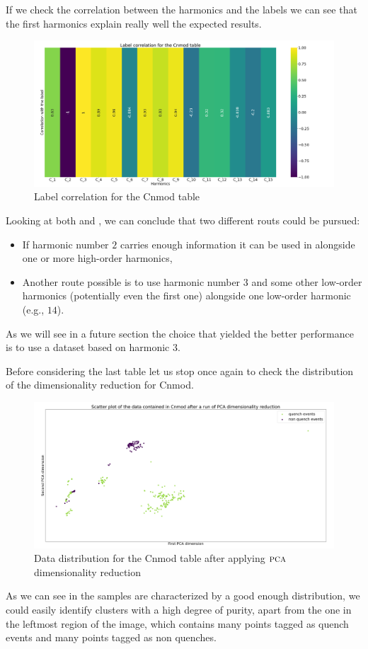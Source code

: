 If we check the correlation between the harmonics and the labels  we can see
that the first harmonics explain really well the expected results.
\begin{figure}[h!]
	\centering
	\includegraphics[width=\linewidth]{img/Cnmod_label_corr.png}
	\caption{Label correlation for the Cnmod table} \label{fig:cnmod-lcorr}
\end{figure}

Looking at both  and , we can conclude that two different
routs could be pursued:
\begin{itemize}
	\item If harmonic number $2$ carries enough information it can be used in alongside one or
	      more high-order harmonics,
	\item Another route possible is to use harmonic number $3$ and some other low-order
	      harmonics (potentially even the first one) alongside one low-order harmonic (e.g.,
	      $14$).
\end{itemize}
As we will see in a future section the choice that yielded the better performance is to use a
dataset based on harmonic $3$.

Before considering the last table let us stop once again to check the distribution of the
dimensionality reduction for Cnmod.
\begin{figure}[h!]
	\centering
	\includegraphics[width=\linewidth]{img/Cnmod_distribution.png}
	\caption{Data distribution for the Cnmod table after applying $\textsc{pca}$ dimensionality
		reduction} \label{fig:cnmod-dist}
\end{figure}
As we can see in  the samples are characterized by a good enough distribution,
we could easily identify clusters with a high degree of purity, apart from the one in the leftmost
region of the image, which contains many points tagged as quench events and many points tagged as
non quenches.


